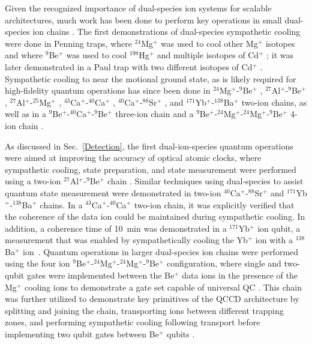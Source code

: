 \documentclass[%
reprint,
 amsmath,amssymb,
]{revtex4-1}
\begin{document}
Given the recognized importance of dual-species ion systems for scalable architectures, much work has been done to perform key operations in small dual-species ion chains \cite{HomeMixedSpecies2013}.  The first demonstrations of dual-species sympathetic cooling were done in Penning traps, where $^{24}$Mg$^+$ was used to cool other Mg$^+$ isotopes \cite{DrullingerSympCooling1980} and where $^9$Be$^+$ was used to cool $^{198}$Hg$^+$ \cite{LarsonSympCooling1986} and multiple isotopes of Cd$^+$ \cite{ImajoSympCooling1996}; it was later demonstrated in a Paul trap with two different isotopes of Cd$^+$ \cite{BlinovSympCooling2002}.  Sympathetic cooling to near the motional ground state, as is likely required for high-fidelity quantum operations has since been done in $^{24}$Mg$^+$-$^9$Be$^+$ \cite{BarrettSympCooling2003}, $^{27}$Al$^+$-$^9$Be$^+$ \cite{SchmidtQuantumLogicSpectroscopy}, $^{27}$Al$^+$-$^{25}$Mg$^+$ \cite{ChouAlClockcomp2010},  $^{43}$Ca$^+$-$^{40}$Ca$^+$ \cite{HomeCompleteMethods2009}, $^{40}$Ca$^+$-$^{88}$Sr$^+$ \cite{BruzewiczQLAR2017}, and $^{171}$Yb$^+$-$^{138}$Ba$^+$ \cite{InlekMultiNode2017} two-ion chains, as well as in a $^{9}$Be$^+$-$^{40}$Ca$^+$-$^{9}$Be$^+$ three-ion chain \cite{NegnevitskyMultiReadout2018} and a $^{9}$Be$^+$-$^{24}$Mg$^+$-$^{24}$Mg$^+$-$^{9}$Be$^+$ 4-ion chain \cite{JostEntangledOsc2009}.

As discussed in Sec.~\ref{Detection}, the first dual-ion-species quantum operations were aimed at improving the accuracy of optical atomic clocks, where sympathetic cooling, state preparation, and state measurement were performed using a two-ion $^{27}$Al$^+$-$^9$Be$^+$ chain \cite{SchmidtQuantumLogicSpectroscopy}.  Similar techniques using dual-species to assist quantum state measurement were demonstrated in two-ion $^{40}$Ca$^+$-$^{88}$Sr$^+$ \cite{BruzewiczQLAR2017} and $^{171}$Yb$^+$-$^{138}$Ba$^+$ \cite{InlekMultiNode2017} chains.  In a $^{43}$Ca$^+$-$^{40}$Ca$^+$ \cite{HomeSympCoolMem2009} two-ion chain, it was explicitly verified that the coherence of the data ion could be maintained during sympathetic cooling.  In addition, a coherence time of 10~min was demonstrated in a $^{171}$Yb$^+$ ion qubit, a measurement that was enabled by sympathetically cooling the Yb$^+$ ion with a $^{138}$Ba$^+$ ion~\cite{wang2017single}. Quantum operations in larger dual-species ion chains were performed using the four ion $^{9}$Be$^+$-$^{24}$Mg$^+$-$^{24}$Mg$^+$-$^{9}$Be$^+$ configuration, where single and two-qubit gates were implemented between the Be$^+$ data ions in the presence of the Mg$^+$ cooling ions to demonstrate a gate set capable of universal QC \cite{HannekeProgrammable2009}.  This chain was further utilized to demonstrate key primitives of the QCCD architecture by splitting and joining the chain, transporting ions between different trapping zones, and performing sympathetic cooling following transport before implementing two qubit gates between Be$^+$ qubits \cite{HomeCompleteMethods2009}.
\end{document}
